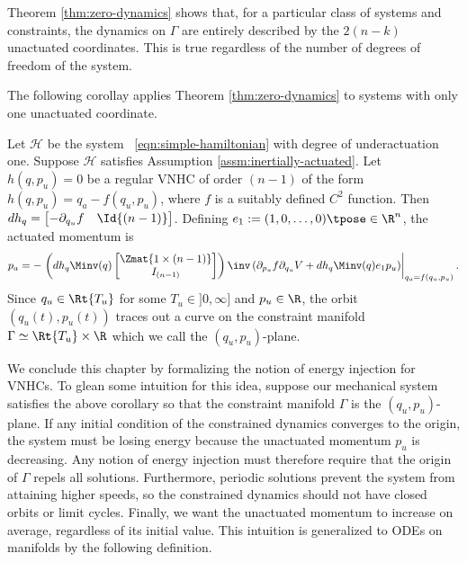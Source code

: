 Theorem \ref{thm:zero-dynamics} shows that, for a particular class of systems
and constraints, the dynamics on \(\Gamma\) are entirely described by the \(2(n-k)\)
unactuated coordinates.
This is true regardless of the number of degrees of freedom of the system.

The following corollay applies Theorem \ref{thm:zero-dynamics} to
systems with only one unactuated coordinate.

\begin{cor}\label{cor:2d-zero-dynamics}
    Let \(\mathcal{H}\) be the system ~\eqref{eqn:simple-hamiltonian} with degree
    of underactuation one.
    Suppose \(\mathcal{H}\) satisfies Assumption \ref{assm:inertially-actuated}.
    Let \(h(q,p_u) = 0\) be a regular VNHC of order \((n-1)\) of the form
    \(h(q,p_u) = q_a - f(q_u,p_u)\),
    where \(f\) is a suitably defined \(C^2\) function.
    Then \(dh_q = \begin{bmatrix} -\partial_{q_u}f & \Id{(n-1)}
    \end{bmatrix}\).
    Defining \(e_1 := (1,0,\ldots,0)\tpose \in \R^n\), the actuated momentum is
    \begin{equation}\label{eqn:g-qupu}
        p_a = -\left.\left(dh_q \Minv(q)
        \begin{bmatrix}
            \Zmat{1\times (n-1)}\\
            I_{(n-1)}
        \end{bmatrix}\right)\inv 
        \left(\partial_{p_u}f \partial_{q_u}V + dh_q \Minv(q)e_1 p_u\right) 
            \right|_{q_a =f(q_u,p_u)}
        .
    \end{equation}
    Since \(q_u \in \Rt{T_u}\) for some \(T_u \in ]0,\infty]\) and \(p_u \in \R\),
    the orbit \((q_u(t),p_u(t))\) traces out
    a curve on the constraint manifold 
    \(\Gamma \simeq \Rt{T_u} \times \R\) which we call the \((q_u,p_u)\)-plane.
\end{cor}

We conclude this chapter by formalizing the notion of energy injection for
VNHCs.
To glean some intuition for this idea, suppose our mechanical system satisfies
the above corollary so that the constraint manifold \(\Gamma\) is the
\((q_u,p_u)\)-plane.
If any initial condition of the constrained dynamics converges to the origin, 
the system must be losing energy because the unactuated momentum
\(p_u\) is decreasing.
Any notion of energy injection must therefore require that the origin of 
\(\Gamma\) repels all solutions.
Furthermore, periodic solutions prevent the system from attaining higher speeds,
so the constrained dynamics should not have closed orbits or limit cycles.
Finally, we want the unactuated momentum to increase on average, regardless of
its initial value. 
This intuition is generalized to ODEs on manifolds by the following definition.

